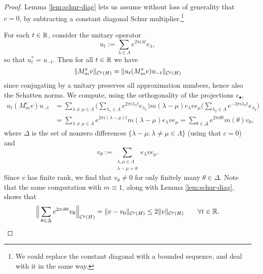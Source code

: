 \begin{proof}
  Lemma \ref{lem:schur-diag} lets us assume without loss of generality that $c = 0$, by subtracting a constant diagonal Schur multiplier.\footnote{We could replace the constant diagonal with a bounded sequence, and deal with it in the same way.}
  
  For each $t \in \mathbb{R}$, consider the unitary operator
  \begin{equation*}
    u_{t} := \sum_{\lambda \in \Lambda} e^{2\pi i \lambda t} e_{\lambda}, 
  \end{equation*}
  so that $u_{t}^{*} = u_{-t}$.
  Then for all $t \in \mathbb{R}$ we have
  \begin{equation*}
    \| M_{m}^{e} v \|_{\mathcal{C}^{p}(H)} = 
    \|u_{t}  (M_{m}^{e} v) u_{-t} \|_{\mathcal{C}^{p}(H)}
  \end{equation*}
  since conjugating by a unitary preserves all approximation numbers, hence also the Schatten norms.
  We compute, using the orthogonality of the projections $e_{\bullet}$,
  \begin{equation*}
    \begin{aligned}
      u_{t}  (M_{m}^{e} v) u_{-t}
      &= \sum_{\lambda \neq \mu \in \Lambda} \Big( \sum_{\lambda_{1} \in \Lambda} e^{2\pi i \lambda_{1} t} e_{\lambda_{1}} \Big)  m(\lambda - \mu) e_{\lambda} v e_{\mu} \Big(\sum_{\lambda_{2} \in \Lambda} e^{-2\pi i \lambda_{2} t} e_{\lambda_{2}} \Big) \\
      &= \sum_{\lambda \neq \mu \in \Lambda} e^{2\pi i (\lambda - \mu) t}  m(\lambda - \mu) e_{\lambda} v e_{\mu} 
      = \sum_{\theta \in \Delta} e^{2\pi i \theta t} m(\theta) v_{\theta},
    \end{aligned}
  \end{equation*}
  where $\Delta$ is the set of nonzero differences $\{\lambda - \mu: \lambda \neq \mu \in \Lambda\}$ (using that $c = 0$)
  and
  \begin{equation*}
    v_{\theta} := \sum_{\substack{\lambda,\mu \in \Lambda \\ \lambda - \mu = \theta}} e_{\lambda} v e_{\mu}.
  \end{equation*}
  Since $v$ has finite rank, we find that $v_{\theta} \neq 0$ for only finitely many $\theta \in \Delta$.
  Note that the same computation with $m \equiv 1$, along with Lemma \ref{lem:schur-diag}, shows that
  \begin{equation*}
    \Big\| \sum_{\theta \in \Delta} e^{2\pi i \theta t} v_{\theta}\Big\|_{\mathcal{C}^{p}(H)} = \|v - v_{0}\|_{\mathcal{C}^{p}(H)} \leq 2\|v\|_{\mathcal{C}^{p}(H)}  \qquad \forall t \in \mathbb{R}.
  \end{equation*}
 

\end{proof}
